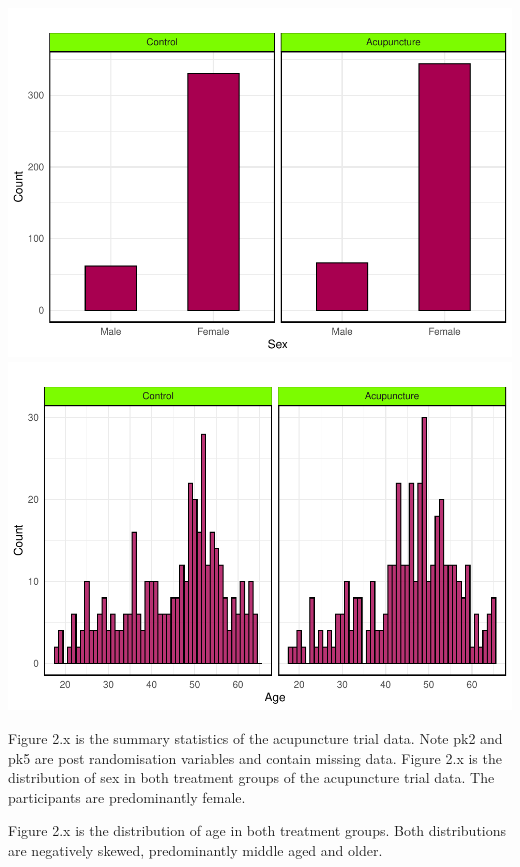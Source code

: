 \documentclass{article}
\newcommand{\pandocbounded}[1]{#1}
\begin{document}
\pandocbounded{\includegraphics[keepaspectratio]{Final_Report_files/figure-latex/unnamed-chunk-3-1.pdf}}
\pandocbounded{\includegraphics[keepaspectratio]{Final_Report_files/figure-latex/unnamed-chunk-3-2.pdf}}

Figure 2.x is the summary statistics of the acupuncture trial data. Note
pk2 and pk5 are post randomisation variables and contain missing data.
Figure 2.x is the distribution of sex in both treatment groups of the
acupuncture trial data. The participants are predominantly female.

Figure 2.x is the distribution of age in both treatment groups. Both
distributions are negatively skewed, predominantly middle aged and
older.
\end{document}

